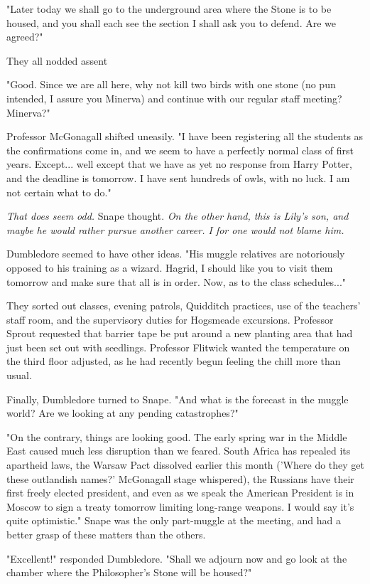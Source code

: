 \documentclass[a4paper,11pt]{article}
\begin{document}
"Later today we shall go to the underground area where the Stone is to be housed, and you shall each see the section I shall ask you to defend. Are we agreed?"

They all nodded assent

"Good. Since we are all here, why not kill two birds with one stone (no pun intended, I assure you Minerva) and continue with our regular staff meeting? Minerva?"

Professor McGonagall shifted uneasily. "I have been registering all the students as the confirmations come in, and we seem to have a perfectly normal class of first years. Except... well except that we have as yet no response from Harry Potter, and the deadline is tomorrow. I have sent hundreds of owls, with no luck. I am not certain what to do."

\emph{That does seem odd.} Snape thought. \emph{On the other hand, this is Lily's son, and maybe he would rather pursue another career. I for one would not blame him.}

Dumbledore seemed to have other ideas. "His muggle relatives are notoriously opposed to his training as a wizard. Hagrid, I should like you to visit them tomorrow and make sure that all is in order. Now, as to the class schedules..."

They sorted out classes, evening patrols, Quidditch practices, use of the teachers' staff room, and the supervisory duties for Hogsmeade excursions. Professor Sprout requested that barrier tape be put around a new planting area that had just been set out with seedlings. Professor Flitwick wanted the temperature on the third floor adjusted, as he had recently begun feeling the chill more than usual.

Finally, Dumbledore turned to Snape. "And what is the forecast in the muggle world? Are we looking at any pending catastrophes?"

"On the contrary, things are looking good. The early spring war in the Middle East caused much less disruption than we feared. South Africa has repealed its apartheid laws, the Warsaw Pact dissolved earlier this month ('Where do they get these outlandish names?' McGonagall stage whispered), the Russians have their first freely elected president, and even as we speak the American President is in Moscow to sign a treaty tomorrow limiting long-range weapons. I would say it's quite optimistic." Snape was the only part-muggle at the meeting, and had a better grasp of these matters than the others.

"Excellent!" responded Dumbledore. "Shall we adjourn now and go look at the chamber where the Philosopher's Stone will be housed?"
\end{document}
